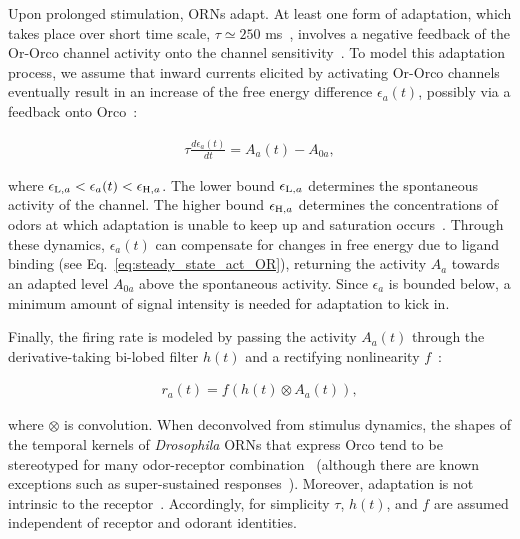 \documentclass[10pt,prl,aps,showpacs,twocolumn,unsortedaddress,showkeys,linenumbers]{revtex4-1}
\begin{document}
{Upon prolonged stimulation, ORNs adapt. At least one form of adaptation, which takes place over short time scale, $\tau\simeq 250$ ms~\cite{srinivas_elife}, involves a negative feedback of the Or-Orco channel activity onto the channel sensitivity~\cite{nagel_wilson_biophysical,srinivas_elife}. To model this adaptation process, we assume that inward currents elicited by activating Or-Orco channels eventually result in an increase of the free energy difference $\epsilon_a(t)$, possibly via a feedback onto Orco~\cite{orco_structure}:

\begin{align}
\tau\frac{d\epsilon_a(t)}{dt} = {A}_{a}(t) - A_{0a},
\label{eq:adaptation_dynamics}
\end{align}

where $\epsilon_{\textup{L}, a} < \epsilon_a(t) < \epsilon_{\textup{H}, a}$. The lower bound $\epsilon_{\textup{L}, a}$ determines the spontaneous activity of the channel. The higher bound $\epsilon_{\textup{H}, a}$ determines the concentrations of odors at which adaptation is unable to keep up and saturation occurs~\cite{srinivas_elife}. Through these dynamics, $\epsilon_a(t)$ can compensate for changes in free energy due to ligand binding (see Eq.~\ref{eq:steady_state_act_OR}), returning the activity $A_a$ towards an adapted level $A_{0a}$ above the spontaneous activity. Since $\epsilon_a$ is bounded below, a minimum amount of signal intensity is needed for adaptation to kick in. 
}
Finally, the firing rate is modeled by passing the activity $A_a(t)$ through the derivative-taking bi-lobed filter $h(t)$ and a rectifying nonlinearity
$f$~\cite{srinivas_elife}:

\begin{align}
r_a(t)=f\left(h(t) \otimes A_a(t)\right),
\label{eq:firing_machinery}
\end{align}

where $\otimes$ is convolution. When deconvolved from stimulus dynamics, the shapes of the temporal kernels of \textit{Drosophila} ORNs that express Orco tend to be stereotyped for many odor-receptor combination~\cite{martelli,srinivas_elife,si2017invariances} 
{\color {blue} 
(although there are known exceptions such as super-sustained responses~\cite{montague2011similar}).
}
Moreover, adaptation is not intrinsic to the receptor~\cite{nagel_wilson_biophysical}. Accordingly, for simplicity $\tau$, $h(t)$, and $f$ are assumed independent of receptor and odorant identities.
\end{document}
